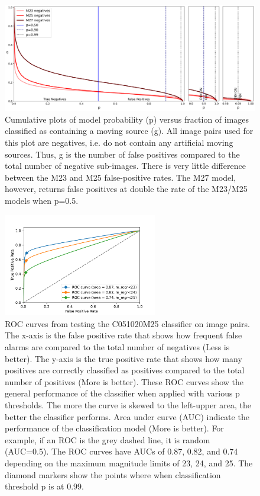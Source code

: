 \documentclass{aastex631}
\begin{document}
\begin{figure}[ht]
    \centering
    \includegraphics[width=\textwidth,keepaspectratio]{Figures/completeness_negatives.png}
    \caption{Cumulative plots of model probability (p) versus fraction of images classified as  containing a moving source (g).  
    All image pairs used for this plot are negatives, i.e. do not contain any artificial moving sources.
    Thus, g is the number of false positives compared to the total number of negative sub-images.
    There is very little difference between the M23 and M25 false-positive rates.
    The M27 model, however, returns false positives at double the rate of the M23/M25 models when p=0.5.}
    \label{fig:negatives}
\end{figure}
\setlength{\tabcolsep}{6pt}

\begin{figure}[ht]
    \centering
    \includegraphics[width=0.6\textwidth,keepaspectratio]{Figures/ROC.pdf}
    \caption{ROC curves from testing the C051020M25 classifier on image pairs.
    The x-axis is the false positive rate that shows how frequent false alarms are compared to the total number of negatives (Less is better).
    The y-axis is the true positive rate that shows how many positives are correctly classified as positives compared to the total number of positives (More is better).
    These ROC curves show the general performance of the classifier when applied with various p thresholds.
    The more the curve is skewed to the left-upper area, the better the classifier performs.
    Area under curve (AUC) indicate the performance of the classification model (More is better).
    For example, if an ROC is the grey dashed line, it is random (AUC=0.5).
    The ROC curves have AUCs of 0.87, 0.82, and 0.74 depending on the maximum magnitude limits of 23, 24, and 25.
    The diamond markers show the points where when classification threshold p is at 0.99.
    }
    \label{fig:ROC}
\end{figure}
\end{document}
